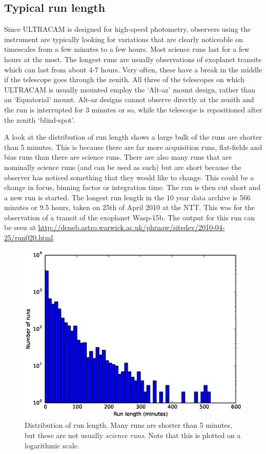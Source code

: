 \subsection{Typical run length}
Since ULTRACAM is designed for high-speed photometry, observers using the instrument are typically looking for variations that are clearly noticeable on timescales from a few minutes to a few hours. Most science runs last for a few hours at the most. The longest runs are usually observations of exoplanet transits which can last from about 4-7 hours. Very often, these have a break in the middle if the telescope goes through the zenith. All three of the telescopes on which ULTRACAM is usually mounted employ the `Alt-az' mount design, rather than an `Equatorial' mount. Alt-az designs cannot observe directly at the zenith and the run is interrupted for 3 minutes or so, while the telescope is repositioned after the zenith `blind-spot'.

A look at the distribution of run length shows a large bulk of the runs are shorter than 5 minutes. This is because there are far more acquisition runs, flat-fields and bias runs than there are science runs. There are also many runs that are nominally science runs (and can be used as such) but are short because the observer has noticed something that they would like to change. This could be a change in focus, binning factor or integration time. The run is then cut short and a new run is started. The longest run length in the 10 year data archive is 566 minutes or 9.5 hours, taken on 25th of April 2010 at the NTT. This was for the observation of a transit of the exoplanet Wasp-15b. The output for this run can be seen at \url{http://deneb.astro.warwick.ac.uk/phrnaw/sitedev/2010-04-25/run020.html}. 

\begin{figure}
  \centering
  \includegraphics[width=120mm]{images/hist0-600_log.eps}
  \caption{Distribution of run length. Many runs are shorter than 5 minutes, but these are not usually \emph{science runs}. Note that this is plotted on a logarithmic scale. }
  \label{fig:histogram0-600}
\end{figure}

